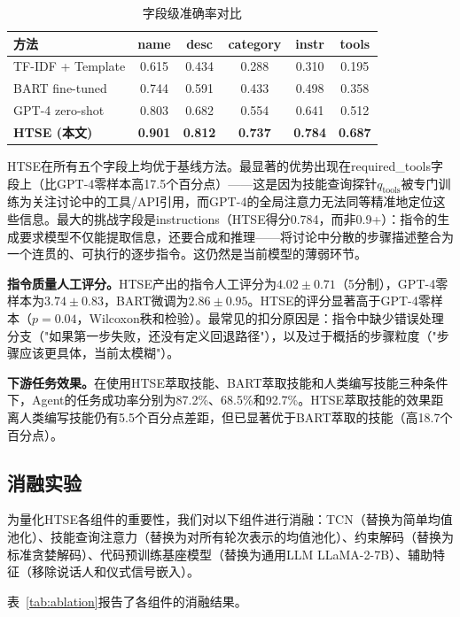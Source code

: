 \documentclass[conference]{IEEEtran}
\begin{document}
\begin{table}[t]
\centering
\caption{字段级准确率对比}
\label{tab:field_accuracy}
\setlength{\tabcolsep}{3pt}
\begin{tabular}{lccccc}
\toprule
方法 & name & desc & category & instr & tools \\
\midrule
TF-IDF + Template & 0.615 & 0.434 & 0.288 & 0.310 & 0.195 \\
BART fine-tuned & 0.744 & 0.591 & 0.433 & 0.498 & 0.358 \\
GPT-4 zero-shot & 0.803 & 0.682 & 0.554 & 0.641 & 0.512 \\
\textbf{HTSE (本文)} & \textbf{0.901} & \textbf{0.812} & \textbf{0.737} & \textbf{0.784} & \textbf{0.687} \\
\bottomrule
\end{tabular}
\end{table}

HTSE在所有五个字段上均优于基线方法。最显著的优势出现在required\_tools字段上（比GPT-4零样本高17.5个百分点）——这是因为技能查询探针$q_{\mathrm{tools}}$被专门训练为关注讨论中的工具/API引用，而GPT-4的全局注意力无法同等精准地定位这些信息。最大的挑战字段是instructions（HTSE得分0.784，而非0.9+）：指令的生成要求模型不仅能提取信息，还要合成和推理——将讨论中分散的步骤描述整合为一个连贯的、可执行的逐步指令。这仍然是当前模型的薄弱环节。

\textbf{指令质量人工评分。}HTSE产出的指令人工评分为$4.02 \pm 0.71$（5分制），GPT-4零样本为$3.74 \pm 0.83$，BART微调为$2.86 \pm 0.95$。HTSE的评分显著高于GPT-4零样本（$p=0.04$，Wilcoxon秩和检验）。最常见的扣分原因是：指令中缺少错误处理分支（"如果第一步失败，还没有定义回退路径"），以及过于概括的步骤粒度（"步骤应该更具体，当前太模糊"）。

\textbf{下游任务效果。}在使用HTSE萃取技能、BART萃取技能和人类编写技能三种条件下，Agent的任务成功率分别为87.2\%、68.5\%和92.7\%。HTSE萃取技能的效果距离人类编写技能仍有5.5个百分点差距，但已显著优于BART萃取的技能（高18.7个百分点）。

\subsection{消融实验}

为量化HTSE各组件的重要性，我们对以下组件进行消融：TCN（替换为简单均值池化）、技能查询注意力（替换为对所有轮次表示的均值池化）、约束解码（替换为标准贪婪解码）、代码预训练基座模型（替换为通用LLM LLaMA-2-7B）、辅助特征（移除说话人和仪式信号嵌入）。

表~\ref{tab:ablation}报告了各组件的消融结果。
\end{document}
